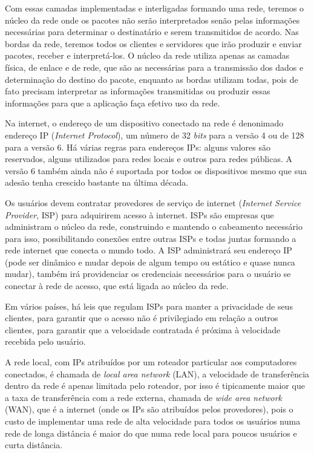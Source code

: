 \documentclass[brazilian,a4paper,twocolumn]{article}
\begin{document}
Com essas camadas implementadas e interligadas formando uma rede, teremos o núcleo da rede onde os pacotes não serão interpretados senão pelas informações necessárias para determinar o destinatário e serem transmitidos de acordo. Nas bordas da rede, teremos todos os clientes e servidores que irão produzir e enviar pacotes, receber e interpretá-los. O núcleo da rede utiliza apenas as camadas física, de enlace e de rede, que são as necessárias para a transmissão dos dados e determinação do destino do pacote, enquanto as bordas utilizam todas, pois de fato precisam interpretar as informações transmitidas ou produzir essas informações para que a aplicação faça efetivo uso da rede.

Na internet, o endereço de um dispositivo conectado na rede é denonimado endereço IP (\textit{Internet Protocol}), um número de 32 \textit{bits} para a versão 4 ou de 128 para a versão 6. Há várias regras para endereços IPs: alguns valores são reservados, alguns utilizados para redes locais e outros para redes públicas. A versão 6 também ainda não é suportada por todos os dispositivos mesmo que sua adesão tenha crescido bastante na última década.

Os usuários devem contratar provedores de serviço de internet (\textit{Internet Service Provider}, ISP) para adquirirem acesso à internet. ISPs são empresas que administram o núcleo da rede, construindo e mantendo o cabeamento necessário para isso, possibilitando conexões entre outras ISPs e todas juntas formando a rede internet que conecta o mundo todo. A ISP administrará seu endereço IP (pode ser dinâmico e mudar depois de algum tempo ou estático e quase nunca mudar), também irá providenciar os credenciais necessários para o usuário se conectar à rede de acesso, que está ligada ao núcleo da rede.

Em vários países, há leis que regulam ISPs para manter a privacidade de seus clientes, para garantir que o acesso não é privilegiado em relação a outros clientes, para garantir que a velocidade contratada é próxima à velocidade recebida pelo usuário.

A rede local, com IPs atribuídos por um roteador particular aos computadores conectados, é chamada de \textit{local area network} (LAN), a velocidade de transferência dentro da rede é apenas limitada pelo roteador, por isso é tipicamente maior que a taxa de transferência com a rede externa, chamada de \textit{wide area network} (WAN), que é a internet (onde os IPs são atribuídos pelos provedores), pois o custo de implementar uma rede de alta velocidade para todos os usuários numa rede de longa distância é maior do que numa rede local para poucos usuários e curta distância.
\end{document}
